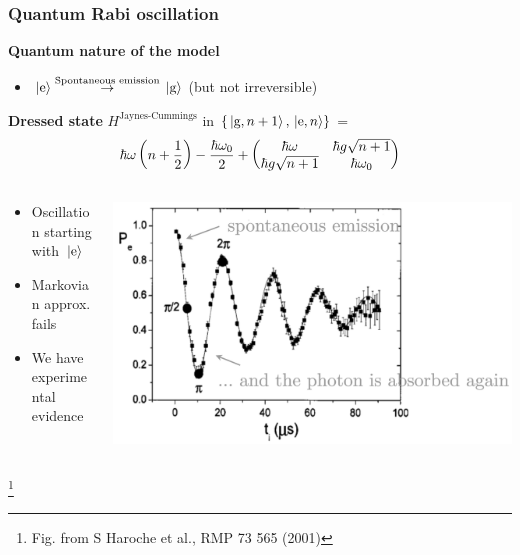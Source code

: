 \documentclass[t]{beamer}
\newcommand\blfootnote[1]{%
\begingroup
\renewcommand\thefootnote{}\footnote{#1}%
\addtocounter{footnote}{-1}%
\endgroup
}
\begin{document}
\begin{frame}[t]
\frametitle{Quantum Rabi oscillation}

\textbf{Quantum nature of the model} \begin{itemize}
    \item $\ket*{\text{e}} \stackrel{\text{Spontaneous emission}}{\to}   \ket*{\text{g}}$ (but not irreversible)
\end{itemize}

\textbf{Dressed state} $H^{\text{Jaynes-Cummings}}$ in $\{ \ket*{\text{g}, n+1}, \ket*{\text{e}, n} \}$ = 
\[
    \hbar \omega \left( n + \frac{1}{2} \right) - \frac{\hbar \omega_0}{2} + 
    \pmqty{
        \hbar \omega  & \hbar g \sqrt{n+1} \\
        \hbar g \sqrt{n+1} & \hbar \omega_0
    }
\]

\begin{columns}[T]
    \begin{column}{0.5\textwidth}
        \begin{itemize}
            \item Oscillation starting with $\ket*{\text{e}}$
            \item Markovian approx. fails
            \item We have experimental evidence \faHandPointRight
        \end{itemize}
    \end{column}
    \begin{column}{0.5\textwidth}
        \includegraphics[width=\textwidth]{figs/quantum-rabi-annotated.png}
    \end{column}
\end{columns}

\blfootnote{Fig. from S Haroche et al., RMP 73 565 (2001)}

\end{frame}
\end{document}
